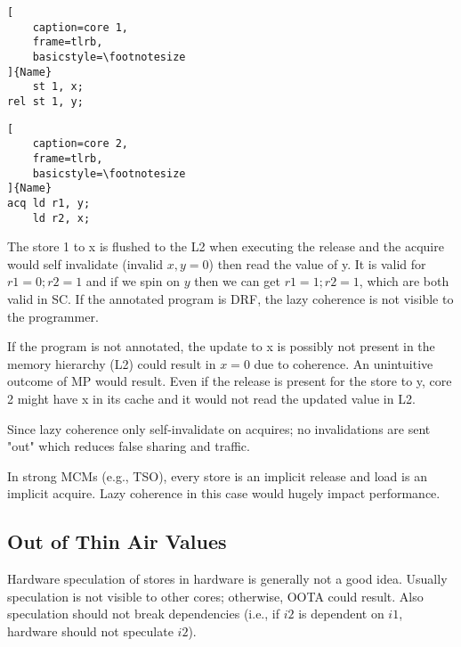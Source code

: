 \documentclass{article}
\begin{document}
\begin{multicols*}{2}
\noindent\begin{minipage}{.2\textwidth}
\captionsetup{labelformat=empty}
\begin{lstlisting}[
    caption=core 1,
    frame=tlrb, 
    basicstyle=\footnotesize
]{Name}
    st 1, x;
rel st 1, y;
\end{lstlisting}
\end{minipage}\hfill
\begin{minipage}{.2\textwidth}
\captionsetup{labelformat=empty}
\begin{lstlisting}[
    caption=core 2,
    frame=tlrb,
    basicstyle=\footnotesize
]{Name}
acq ld r1, y;
    ld r2, x;
\end{lstlisting}
\end{minipage}

\noindent\newline
The store 1 to x is flushed to the L2 when executing the release and the acquire would self invalidate (invalid $x, y = 0$) then read the value of y. It is valid for $r1=0; r2=1$ and if we spin on $y$ then we can get $r1=1; r2=1$, which are both valid in SC. If the annotated program is DRF, the lazy coherence is not visible to the programmer.

\noindent\newline
If the program is not annotated, the update to x is possibly not present in the memory hierarchy (L2) could result in $x=0$ due to coherence. An unintuitive outcome of MP would result. Even if the release is present for the store to y, core 2 might have x in its cache and it would not read the updated value in L2.

\noindent\newline
Since lazy coherence only self-invalidate on acquires; no invalidations are sent "out" which reduces false sharing and traffic.

\noindent\newline
In strong MCMs (e.g., TSO), every store is an implicit release and load is an implicit acquire. Lazy coherence in this case would hugely impact performance.

\subsection{Out of Thin Air Values}
Hardware speculation of stores in hardware is generally not a good idea. Usually speculation is not visible to other cores; otherwise, OOTA could result. Also speculation should not break dependencies (i.e., if $i2$ is dependent on $i1$, hardware should not speculate $i2$).


\end{multicols*}
\end{document}
